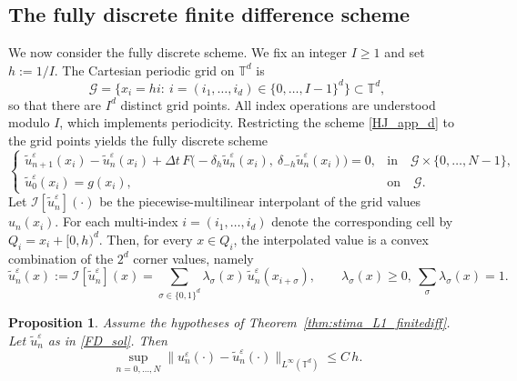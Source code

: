 \documentclass[11pt]{amsart}
\newtheorem{prop}[thm]{Proposition}
\theoremstyle{remark}
\theoremstyle{definition}
\theoremstyle{Claim}
\newcommand{\T}{{\mathbb{T}}}
\theoremstyle{plain}
\begin{document}
\subsection{The fully discrete finite difference scheme}\label{sec:fully_fd}
We now consider the fully discrete scheme. We fix an integer $I\ge 1$ and set $h:=1/I$. The Cartesian periodic grid on $\mathbb{T}^d$ is
\[
\mathcal{G}=\{x_i=hi:\ i=(i_1,\dots,i_d)\in\{0,\dots,I-1\}^d\}\subset\mathbb{T}^d,
\]
so that there are $I^d$ distinct grid points. All index operations are understood modulo $I$, which implements periodicity.
 Restricting the scheme \eqref{HJ_app_d} to the grid points yields the fully discrete scheme
\begin{equation}\label{HJ_app_fully_d}
\left\{
\begin{array}{ll}
\tilde u^\varepsilon_{n+1}(x_i)-\tilde u^\varepsilon_n(x_i)  + \Delta t \, F\!\big( - \delta_{h} \tilde u^\varepsilon_n(x_i)  ,\ \delta_{-h} \tilde u^\varepsilon_n(x_i) \big) =0, 
& \text{in} \quad \mathcal{G}\times\{0,\dots,N-1\},   \\[6pt]
\tilde u^\varepsilon_0(x_i)= g(x_i), & \text{on}\quad\mathcal{G}.
\end{array}\right.
\end{equation}
Let $\mathcal{I}[\tilde u^\varepsilon_n](\cdot)$ be the piecewise-multilinear interpolant of the grid values $u_n(x_i)$. 
For each multi-index $i=(i_1,\dots,i_d)$ denote the corresponding cell by
\(
Q_i = x_i + [0,h)^d.
\)
Then, for every $x\in Q_i$, the interpolated value is a convex combination of the $2^d$ corner values, namely
\begin{equation}\label{FD_sol}
\tilde u_n^\varepsilon(x):=\mathcal{I}[\tilde u^\varepsilon_n](x)=\sum_{\sigma\in\{0,1\}^d}\lambda_\sigma(x)\,\tilde u^\varepsilon_n(x_{i+\sigma}),
\qquad \lambda_\sigma(x)\ge0,\ \sum_{\sigma}\lambda_\sigma(x)=1.
\end{equation}
\begin{prop}\label{prop:stima_semi_fully}
Assume the hypotheses of Theorem~\ref{thm:stima_L1_finitediff}. Let $\tilde u_n^\varepsilon$ as in \eqref{FD_sol}. Then
	\begin{equation}\label{semidis_fullydis_d}
\sup_{n=0,\dots,N}\big\|u_n^\varepsilon(\cdot)-\tilde u_n^\varepsilon(\cdot)\big\|_{L^\infty(\T^d)} \le C\,h.
\end{equation}
\end{prop}
\end{document}
